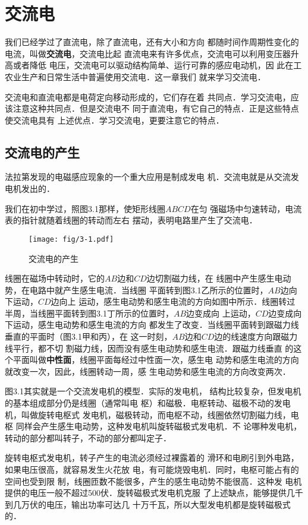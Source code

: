 \chapter{交流电}
我们已经学过了直流电，除了直流电，还有大小和方向
都随时间作周期性变化的电流，叫做\textbf{交流电}，交流电比起
直流电来有许多优点，交流电可以利用变压器升高或者降低
电压，交流电可以驱动结构简单、运行可靠的感应电动机，因
此在工农业生产和日常生活中普遍使用交流电．这一章我们
就来学习交流电．

交流电和直流电都是电荷定向移动形成的，它们存在着
共同点．学习交流电，应该注意这种共同点．但是交流电不
同于直流电，有它自己的特点．正是这些特点使交流电具有
上述优点．学习交流电，更要注意它的特点．

\section{交流电的产生}


法拉第发现的电磁感应现象的一个重大应用是制成发电
机．交流电就是从交流发电机发出的．

我们在初中学过，照图3.1那样，使矩形线圈$ABCD$在匀
强磁场中匀速转动，电流表的指针就随着线圈的转动而左右
摆动，表明电路里产生了交流电．

\begin{figure}[htp]\centering
    \texttt{[image: fig/3-1.pdf]}
    \caption{交流电的产生}
    \end{figure}

线圈在磁场中转动时，它的$AB$边和$CD$边切割磁力线，在
线圈中产生感生电动势，在电路中就产生感生电流．当线圈
平面转到图3.1乙所示的位置时，$AB$边向下运动，$CD$边向上
运动，感生电动势和感生电流的方向如图中所示．线圈转过
半周，当线圈平面转到图3.1丁所示的位置时，$AB$边变成向
上运动，$CD$边变成向下运动，感生电动势和感生电流的方向
都发生了改变．当线圈平面转到跟磁力线垂直的平面时（图3.1甲和丙），在
这一时刻，$AB$边和$CD$边的线速度方向跟磁力线平行，都不切
割磁力线，因而没有感生电动势和感生电流．跟磁力线垂直
的这个平面叫做\textbf{中性面}，线圈平面每经过中性面一次，感生电
动势和感生电流的方向就改变一次，因此，线圈转动一周，感
生电动势和感生电流的方向改变两次．

图3.1其实就是一个交流发电机的模型．实际的发电机，
结构比较复杂，但发电机的基本组成部分仍是线圈（通常叫电
枢）和磁极．电枢转动、磁极不动的发电机，叫做旋转电枢式
发电机，磁极转动，而电枢不动，线圈依然切割磁力线，电枢
同样会产生感生电动势，这种发电机叫旋转磁极式发电机．不
论哪种发电机，转动的部分都叫转子，不动的部分都叫定子．

旋转电枢式发电机，转子产生的电流必须经过裸露着的
滑环和电刷引到外电路，如果电压很高，就容易发生火花放
电，有可能烧毁电机．同时，电枢可能占有的空间也受到限
制，线圈匝数不能很多，产生的感生电动势不能很高．这种发
电机提供的电压一般不超过500伏．旋转磁极式发电机克服
了上述缺点，能够提供几千到几万伏的电压，输出功率可达几
十万千瓦，所以大型发电机都是旋转磁极式的．


